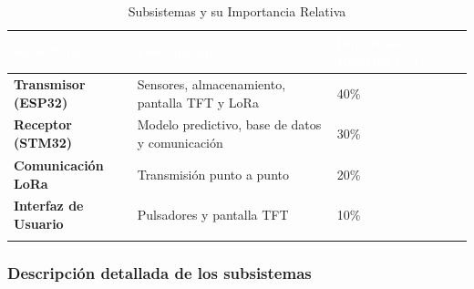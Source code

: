 \documentclass[12pt,a4paper, twosite]{article}
\begin{document}
\begin{longtable}{|p{6cm}|p{6cm}|p{2cm}|}
  \hline
  \cellcolor[HTML]{4472C4}\textcolor{white}{\textbf{Subsistema}} & \cellcolor[HTML]{4472C4}\textcolor{white}{\textbf{Descripción}} & \cellcolor[HTML]{4472C4}\textcolor{white}{\textbf{Importancia Relativa (\%)}} \\ \hline
  \textbf{Transmisor (ESP32)} & Sensores, almacenamiento, pantalla TFT y LoRa & 40\% \\ \hline
  \textbf{Receptor (STM32)} & Modelo predictivo, base de datos y comunicación & 30\% \\ \hline
  \textbf{Comunicación LoRa} & Transmisión punto a punto & 20\% \\ \hline
  \textbf{Interfaz de Usuario} & Pulsadores y pantalla TFT & 10\% \\ \hline
  \caption{Subsistemas y su Importancia Relativa} \label{tab:subsistemas_importancia} \\
\end{longtable}

\subsubsection*{Descripción detallada de los subsistemas}
\end{document}
